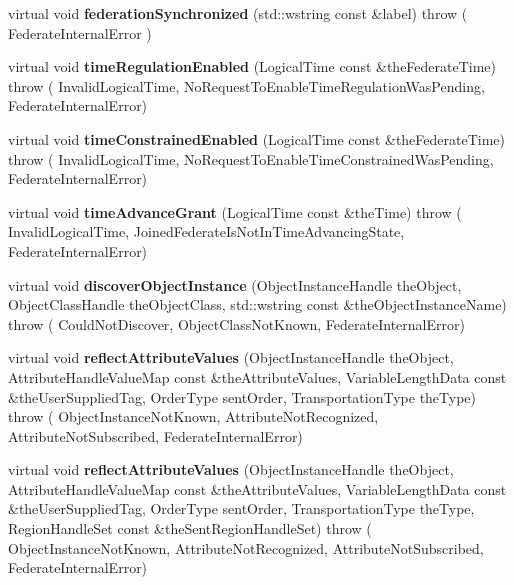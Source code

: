 \begin{DoxyCompactItemize}
\item 
\hypertarget{class_example_fed_amb_a669aaa11775b243bf31eeba1e3013da7}{
virtual void {\bfseries federationSynchronized} (std::wstring const \&label)  throw ( FederateInternalError )}
\label{class_example_fed_amb_a669aaa11775b243bf31eeba1e3013da7}

\item 
\hypertarget{class_example_fed_amb_ab19e5bb9c9b3ff8bd1ac0c502f442ef9}{
virtual void {\bfseries timeRegulationEnabled} (LogicalTime const \&theFederateTime)  throw ( InvalidLogicalTime, 					NoRequestToEnableTimeRegulationWasPending, 					FederateInternalError)}
\label{class_example_fed_amb_ab19e5bb9c9b3ff8bd1ac0c502f442ef9}

\item 
\hypertarget{class_example_fed_amb_a55bab7930d8dbad06ce854da213c44a8}{
virtual void {\bfseries timeConstrainedEnabled} (LogicalTime const \&theFederateTime)  throw ( InvalidLogicalTime, 					NoRequestToEnableTimeConstrainedWasPending, 					FederateInternalError)}
\label{class_example_fed_amb_a55bab7930d8dbad06ce854da213c44a8}

\item 
\hypertarget{class_example_fed_amb_a78023d52917d57b2dfe6999857c4385d}{
virtual void {\bfseries timeAdvanceGrant} (LogicalTime const \&theTime)  throw ( InvalidLogicalTime, 					JoinedFederateIsNotInTimeAdvancingState, 					FederateInternalError)}
\label{class_example_fed_amb_a78023d52917d57b2dfe6999857c4385d}

\item 
\hypertarget{class_example_fed_amb_a70393fb4c12f95503f8522405b82522f}{
virtual void {\bfseries discoverObjectInstance} (ObjectInstanceHandle theObject, ObjectClassHandle theObjectClass, std::wstring const \&theObjectInstanceName)  throw ( CouldNotDiscover, 					ObjectClassNotKnown, 					FederateInternalError)}
\label{class_example_fed_amb_a70393fb4c12f95503f8522405b82522f}

\item 
\hypertarget{class_example_fed_amb_a315fa8e1e38b2cdc20a73c6abecd09a0}{
virtual void {\bfseries reflectAttributeValues} (ObjectInstanceHandle theObject, AttributeHandleValueMap const \&theAttributeValues, VariableLengthData const \&theUserSuppliedTag, OrderType sentOrder, TransportationType theType)  throw ( ObjectInstanceNotKnown, 					AttributeNotRecognized, 					AttributeNotSubscribed, 					FederateInternalError)}
\label{class_example_fed_amb_a315fa8e1e38b2cdc20a73c6abecd09a0}

\item 
\hypertarget{class_example_fed_amb_a27954ad536950cd6c29dc6d3bf55f176}{
virtual void {\bfseries reflectAttributeValues} (ObjectInstanceHandle theObject, AttributeHandleValueMap const \&theAttributeValues, VariableLengthData const \&theUserSuppliedTag, OrderType sentOrder, TransportationType theType, RegionHandleSet const \&theSentRegionHandleSet)  throw ( ObjectInstanceNotKnown, 					AttributeNotRecognized, 					AttributeNotSubscribed, 					FederateInternalError)}
\label{class_example_fed_amb_a27954ad536950cd6c29dc6d3bf55f176}


\end{DoxyCompactItemize}
